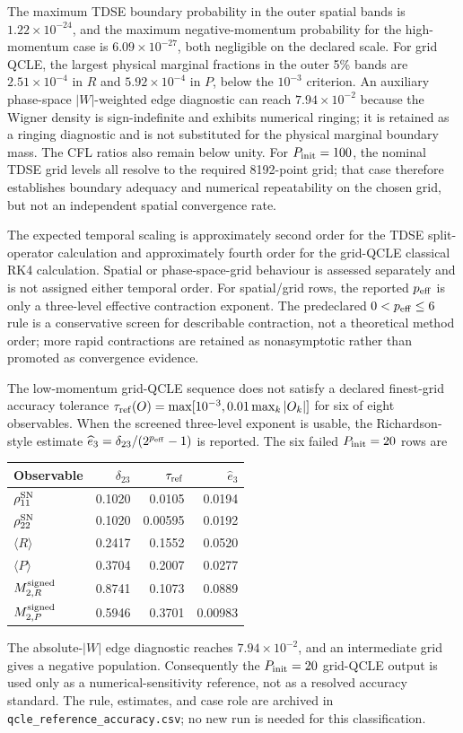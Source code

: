 \documentclass[
  11pt,
  letterpaper,
  onehalfspacing,
  normalmargins,
  equalmargins,
  oneside
]{ut-thesis}
\begin{document}
The maximum TDSE boundary probability in the outer spatial bands is
\(1.22\times10^{-24}\), and the maximum negative-momentum probability for the
high-momentum case is \(6.09\times10^{-27}\), both negligible on the declared
scale. For grid QCLE, the largest physical marginal fractions in the outer
5\% bands are \(2.51\times10^{-4}\) in \(R\) and
\(5.92\times10^{-4}\) in \(P\), below the \(10^{-3}\) criterion. An auxiliary
phase-space \(|W|\)-weighted edge diagnostic can reach \(7.94\times10^{-2}\)
because the Wigner density is sign-indefinite and exhibits numerical ringing;
it is retained as a ringing diagnostic and is not substituted for the physical
marginal boundary mass. The CFL ratios also remain below unity. For
\(P_{\rm init}=100\), the nominal TDSE grid levels all resolve to the required
8192-point grid; that case therefore establishes boundary adequacy and
numerical repeatability on the chosen grid, but not an independent spatial
convergence rate.

The expected temporal scaling is approximately second order for the TDSE
split-operator calculation and approximately fourth order for the grid-QCLE
classical RK4 calculation. Spatial or phase-space-grid behaviour is assessed
separately and is not assigned either temporal order. For spatial/grid rows,
the reported \(p_{\rm eff}\) is only a three-level effective contraction
exponent. The predeclared \(0<p_{\rm eff}\leq6\) rule is a conservative
screen for describable contraction, not a theoretical method order; more
rapid contractions are retained as nonasymptotic rather than promoted as
convergence evidence.

The low-momentum grid-QCLE sequence does not satisfy a declared finest-grid
accuracy tolerance
\(\tau_{\rm ref}(O)=\max[10^{-3},0.01\max_k|O_k|]\) for six of eight
observables. When the screened three-level exponent is usable, the
Richardson-style estimate
\(\widehat e_3=\delta_{23}/(2^{p_{\rm eff}}-1)\) is reported. The six
failed \(P_{\rm init}=20\) rows are
\begin{center}
\small
\begin{tabular}{lrrr}
\toprule
Observable & \(\delta_{23}\) & \(\tau_{\rm ref}\) & \(\widehat e_3\)\\
\midrule
\(\rho_{11}^{\rm SN}\) & 0.1020 & 0.0105 & 0.0194\\
\(\rho_{22}^{\rm SN}\) & 0.1020 & 0.00595 & 0.0192\\
\(\langle R\rangle\) & 0.2417 & 0.1552 & 0.0520\\
\(\langle P\rangle\) & 0.3704 & 0.2007 & 0.0277\\
\(M^{\rm signed}_{2,R}\) & 0.8741 & 0.1073 & 0.0889\\
\(M^{\rm signed}_{2,P}\) & 0.5946 & 0.3701 & 0.00983\\
\bottomrule
\end{tabular}
\end{center}
The absolute-\(|W|\) edge diagnostic reaches \(7.94\times10^{-2}\), and an
intermediate grid gives a negative population. Consequently the
\(P_{\rm init}=20\) grid-QCLE output is used only as a numerical-sensitivity
reference, not as a resolved accuracy standard. The rule, estimates, and
case role are archived in \texttt{qcle\_reference\_accuracy.csv}; no new run
is needed for this classification.
\end{document}

